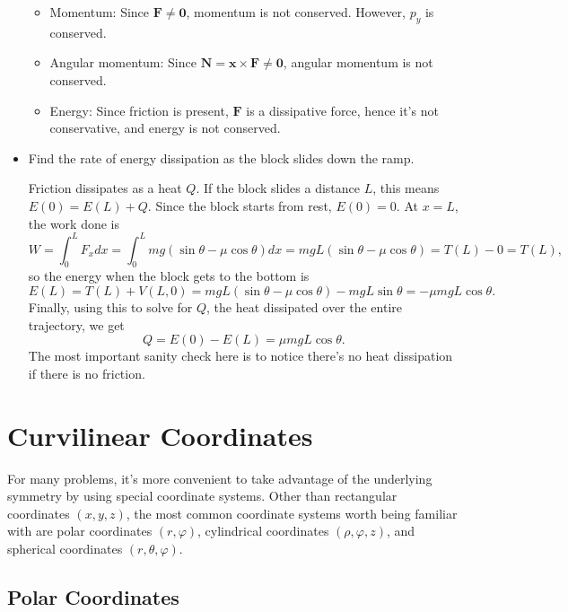 \documentclass[
  letterpaper,
  DIV=11,
  numbers=noendperiod]{scrreprt}
\providecommand{\tightlist}{%
  \setlength{\itemsep}{0pt}\setlength{\parskip}{0pt}}\usepackage{longtable,booktabs,array}
\begin{document}
\begin{itemize}
  \begin{itemize}
  \tightlist
  \item
    Momentum: Since \(\mathbf{F} \neq \mathbf{0}\), momentum is not
    conserved. However, \(p_y\) is conserved.
  \item
    Angular momentum: Since
    \(\mathbf{N} = \mathbf{x} \times \mathbf{F} \neq \mathbf{0}\),
    angular momentum is not conserved.
  \item
    Energy: Since friction is present, \(\mathbf{F}\) is a dissipative
    force, hence it's not conservative, and energy is not conserved.
  \end{itemize}
\item
  Find the rate of energy dissipation as the block slides down the ramp.

  Friction dissipates as a heat \(Q\). If the block slides a distance
  \(L\), this means \(E(0) = E(L) + Q\). Since the block starts from
  rest, \(E(0) = 0\). At \(x=L\), the work done is \[
  W = \int_0^L F_x dx = \int_0^L mg(\sin\theta - \mu\cos\theta)dx = mgL(\sin\theta - \mu\cos\theta) = T(L) - 0 = T(L),
  \] so the energy when the block gets to the bottom is \[
  E(L) = T(L) + V(L,0) = mgL(\sin\theta - \mu\cos\theta) - mgL\sin\theta = -\mu mgL\cos\theta.
  \] Finally, using this to solve for \(Q\), the heat dissipated over
  the entire trajectory, we get \[
  Q = E(0) - E(L) = \mu mgL\cos\theta.
  \] The most important sanity check here is to notice there's no heat
  dissipation if there is no friction.
\end{itemize}

\hypertarget{curvilinear-coordinates}{%
\section{Curvilinear Coordinates}\label{curvilinear-coordinates}}

For many problems, it's more convenient to take advantage of the
underlying symmetry by using special coordinate systems. Other than
rectangular coordinates \((x,y,z)\), the most common coordinate systems
worth being familiar with are polar coordinates \((r,\varphi)\),
cylindrical coordinates \((\rho,\varphi,z)\), and spherical coordinates
\((r,\theta,\varphi)\).

\hypertarget{polar-coordinates}{%
\subsection{Polar Coordinates}\label{polar-coordinates}}
\end{document}
